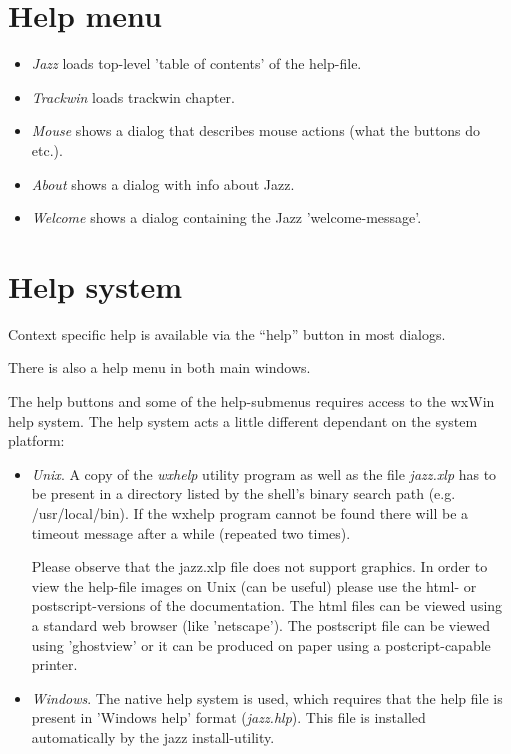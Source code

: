 \documentclass[letterpaper]{report}
\begin{document}
\section{Help menu}\label{twhelp}

\begin{itemize}

\item {\em Jazz} loads top-level 'table of contents' of the help-file.

\item {\em Trackwin} loads trackwin chapter.

\item {\em Mouse} shows a dialog that describes mouse actions (what the buttons do
etc.).

\item {\em About} shows a dialog with info about Jazz.

\item {\em Welcome} shows a dialog containing the Jazz 'welcome-message'.

\end{itemize}

\section{Help system}\label{help}
Context specific help is available via the ``help'' button in most dialogs.

There is also a help menu in both main windows.

The help buttons and some of the help-submenus requires access to
the wxWin help system. The help system acts a little different dependant
on the system platform:

\begin{itemize}
\item {\em Unix}. A copy of the {\em wxhelp} utility program as well as
the file {\em jazz.xlp} has to be present in a directory listed by the
shell's binary search path (e.g. /usr/local/bin). If the wxhelp program
cannot be found there will be a timeout message
after a while (repeated two times).

Please observe that the jazz.xlp file does not support graphics.
In order to view the help-file images on Unix (can be useful)
please use the html- or postscript-versions of the documentation. The html
files can be viewed using a standard web browser (like 'netscape'). The
postscript file can be viewed using 'ghostview' or it can be produced on paper
using a postcript-capable printer.

\item {\em Windows}. The native help system is used, which requires that the
help file is present in 'Windows help' format ({\em jazz.hlp}). This file is
installed automatically by the jazz install-utility.
\end{itemize}
\end{document}
